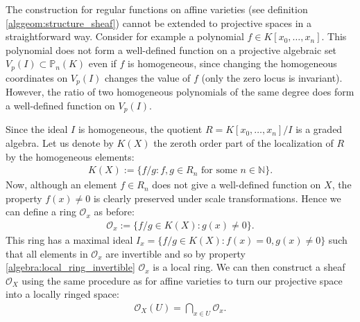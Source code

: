{{    

    The construction for regular functions on affine varieties (see definition \ref{alggeom:structure_sheaf}) cannot be extended to projective spaces in a straightforward way. Consider for example a polynomial $f\in K[x_0,\ldots,x_n]$. This polynomial does not form a well-defined function on a projective algebraic set $V_p(I)\subset \mathbb{P}_n(K)$ even if $f$ is homogeneous, since changing the homogeneous coordinates on $V_p(I)$ changes the value of $f$ (only the zero locus is invariant). However, the ratio of two homogeneous polynomials of the same degree does form a well-defined function on $V_p(I)$.

    Since the ideal $I$ is homogeneous, the quotient $R=K[x_0,\ldots,x_n]/I$ is a graded algebra. Let us denote by $K(X)$ the zeroth order part of the localization of $R$ by the homogeneous elements:
    \begin{gather}
        K(X) := \{f/g: f,g\in R_n\text{ for some }n\in\mathbb{N}\}.
    \end{gather}
    Now, although an element $f\in R_n$ does not give a well-defined function on $X$, the property $f(x)\neq0$ is clearly preserved under scale transformations. Hence we can define a ring $\mathcal{O}_x$ as before:
    \begin{gather}
        \mathcal{O}_x := \{f/g\in K(X): g(x)\neq 0\}.
    \end{gather}
    This ring has a maximal ideal $I_x = \{f/g\in K(X):f(x)=0, g(x)\neq 0\}$ such that all elements in $\mathcal{O}_x$ are invertible and so by property \ref{algebra:local_ring_invertible} $\mathcal{O}_x$ is a local ring. We can then construct a sheaf $\mathcal{O}_X$ using the same procedure as for affine varieties to turn our projective space into a locally ringed space:
    \begin{gather}
        \mathcal{O}_X(U) = \bigcap_{x\in U}\mathcal{O}_x.
    \end{gather}

}}
